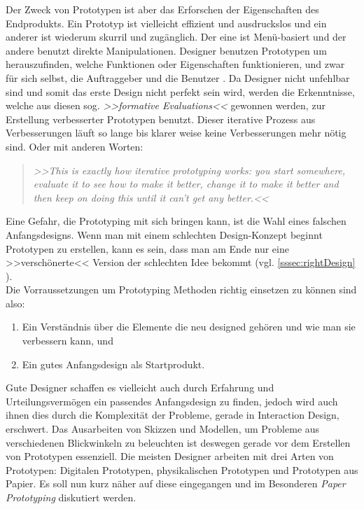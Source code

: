 Der Zweck von Prototypen ist aber das Erforschen der Eigenschaften des Endprodukts. Ein Prototyp ist vielleicht effizient und ausdruckslos und ein anderer ist wiederum skurril und zugänglich. Der eine ist Menü-basiert und der andere benutzt direkte Manipulationen. Designer benutzen Prototypen um herauszufinden, welche Funktionen oder Eigenschaften funktionieren, und zwar für sich selbst, die Auftraggeber und die Benutzer \citep{Saffer:2007}. Da Designer nicht unfehlbar sind und somit das erste Design nicht perfekt sein wird, werden die Erkenntnisse, welche aus diesen sog. \emph{>>formative Evaluations<<} gewonnen werden, zur Erstellung verbesserter Prototypen benutzt. Dieser iterative Prozess aus Verbesserungen läuft so lange bis klarer weise keine Verbesserungen mehr nötig sind. Oder mit anderen Worten: 

\begin{quote}
	\textsl{>>This is exactly how iterative prototyping works: you start somewhere, evaluate it to see how to make it better, change it to make it better and then keep on doing this until it can't get any better.<<}
\begin{flushright}\citep{Dix:2004}\end{flushright}
\end{quote}

Eine Gefahr, die Prototyping mit sich bringen kann, ist die Wahl eines falschen Anfangsdesigns. Wenn man mit einem schlechten Design-Konzept beginnt Prototypen zu erstellen, kann es sein, dass man am Ende nur eine >>verschönerte<< Version der schlechten Idee bekommt (vgl. \ref{sssec:rightDesign} ).\\ Die Vorraussetzungen um Prototyping Methoden richtig einsetzen zu können sind also:

\begin{enumerate}
	\item Ein Verständnis über die Elemente die neu designed gehören und wie man sie verbessern kann, und
	\item Ein gutes Anfangsdesign als Startprodukt.
\end{enumerate}
\begin{flushright}\citep{Dix:2004}\end{flushright}

Gute Designer schaffen es vielleicht auch durch Erfahrung und Urteilungsvermögen ein passendes Anfangsdesign zu finden, jedoch wird auch ihnen dies durch die Komplexität der Probleme, gerade in Interaction Design, erschwert. Das Ausarbeiten von Skizzen und Modellen, um Probleme aus verschiedenen Blickwinkeln zu beleuchten ist deswegen gerade vor dem Erstellen von Prototypen essenziell.
Die meisten Designer arbeiten mit drei Arten von Prototypen: Digitalen Prototypen, physikalischen Prototypen und Prototypen aus Papier. Es soll nun kurz näher auf diese eingegangen und im Besonderen \emph{Paper Prototyping} diskutiert werden. 

